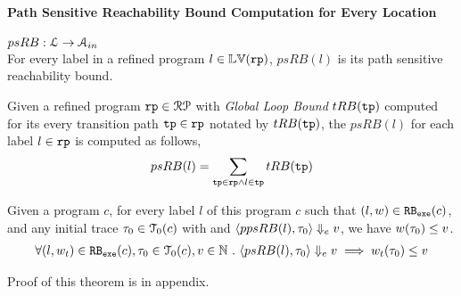 \paragraph*{Path Sensitive Reachability Bound Computation for Every Location}
$psRB : \mathcal{L} \to \mathcal{A}_{in}$
\\
For every label in a refined program $l \in \mathbb{LV}(\mathtt{rp})$,
 $psRB(l)$ is its path sensitive reachability bound.
 \\
 \begin{defn}
  \label{def:label_psrb}
Given a refined program $\mathtt{rp} \in \mathcal{RP}$ with 
\emph{Global Loop Bound} $tRB(\mathtt{tp})$
computed for its every transition path $\mathtt{tp} \in \mathtt{rp}$  notated by $tRB(\mathtt{tp})$,
the $psRB(l)$ for each label $l \in \mathtt{rp}$ is computed as follows,
\\
\[ psRB(l) = \sum\limits_{\mathtt{tp} \in \mathtt{rp} \land 
l \in \mathtt{tp}} tRB(\mathtt{tp})\]
 \end{defn}
\begin{thm}
  \label{thm:pathsensitive_rb_soundness}
Given a program ${c}$, for every label $l$ of this program $c$ such that $(l, w) \in \mathtt{RB_{exe}}(c)$, 
and any initial trace $\mathtt{\tau}_0 \in \mathcal{T}_0(c)$ with 
and $\langle ppsRB(l), \mathtt{\tau}_0 \rangle \Downarrow_e v$,
we have $ w(\mathtt{\tau}_0) \leq v $.
%
\[
  \begin{array}{l}
  \forall (l, w_{t}) \in \mathtt{RB_{exe}}(c),
  \mathtt{\tau}_0 \in \mathcal{T}_0(c), 
  v \in \mathbb{N} ~.~
  \langle psRB(l), \mathtt{\tau}_0 \rangle \Downarrow_e v
  \implies
  w_{t}(\mathtt{\tau}_0) \leq v
  \end{array}
\]
\end{thm}
%
Proof of this theorem is in appendix.